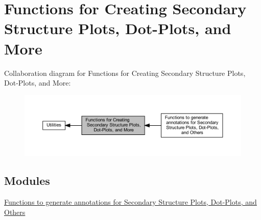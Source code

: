 \hypertarget{group__plotting__utils}{}\section{Functions for Creating Secondary Structure Plots, Dot-\/\+Plots, and More}
\label{group__plotting__utils}
Collaboration diagram for Functions for Creating Secondary Structure Plots, Dot-\/\+Plots, and More\+:
\nopagebreak
\begin{figure}[H]
\begin{center}
\leavevmode
\includegraphics[width=350pt]{group__plotting__utils}
\end{center}
\end{figure}
\subsection*{Modules}
\begin{DoxyCompactItemize}
\item 
\hyperlink{group__annotation__utils}{Functions to generate annotations for Secondary Structure Plots, Dot-\/\+Plots, and Others}
\end{DoxyCompactItemize}
